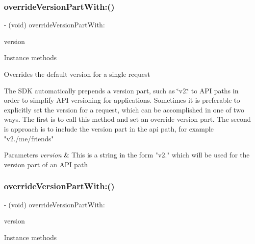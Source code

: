 \subsubsection{\texorpdfstring{override\+Version\+Part\+With\+:()}{overrideVersionPartWith:()}\hspace{0.1cm}{\footnotesize\ttfamily [4/5]}}
{\footnotesize\ttfamily -\/ (void) override\+Version\+Part\+With\+: \begin{DoxyParamCaption}\item[{(N\+S\+String $\ast$)}]{version }\end{DoxyParamCaption}}

Instance methods

Overrides the default version for a single request

The S\+DK automatically prepends a version part, such as \char`\"{}v2.\char`\"{} to A\+PI paths in order to simplify A\+PI versioning for applications. Sometimes it is preferable to explicitly set the version for a request, which can be accomplished in one of two ways. The first is to call this method and set an override version part. The second is approach is to include the version part in the api path, for example "v2./me/friends"


\begin{DoxyParams}{Parameters}
{\em version} & This is a string in the form "v2." which will be used for the version part of an A\+PI path \\
\hline
\end{DoxyParams}
\mbox{\label{interfaceFBRequest_a96f27df0edb3e41045bf5ba9ede2431c}} 
\subsubsection{\texorpdfstring{override\+Version\+Part\+With\+:()}{overrideVersionPartWith:()}\hspace{0.1cm}{\footnotesize\ttfamily [5/5]}}
{\footnotesize\ttfamily -\/ (void) override\+Version\+Part\+With\+: \begin{DoxyParamCaption}\item[{(N\+S\+String $\ast$)}]{version }\end{DoxyParamCaption}}

Instance methods

